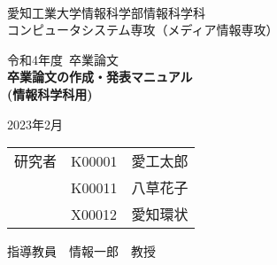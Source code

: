 \begin{titlepage}

\ \\
\begin{center}

{\LARGE 愛知工業大学情報科学部情報科学科\\
コンピュータシステム専攻（メディア情報専攻）

\vspace{1.0cm}

令和4年度~卒業論文\\

\vspace{2.0cm}
{\Huge
\baselineskip=15mm
\textbf{卒業論文の作成・発表マニュアル\\
(情報科学科用)\\}}

\vspace{7.0cm}

2023年2月\\

\vspace{1.0cm}

\begin{tabular}[h]{lll}
  研究者  & K00001 & 愛工太郎\\
         & K00011 & 八草花子\\
         & X00012 & 愛知環状\\
\end{tabular}

\vspace{1.0cm}

指導教員\ \ 情報一郎\ \ 教授}

\end{center}

\end{titlepage}
